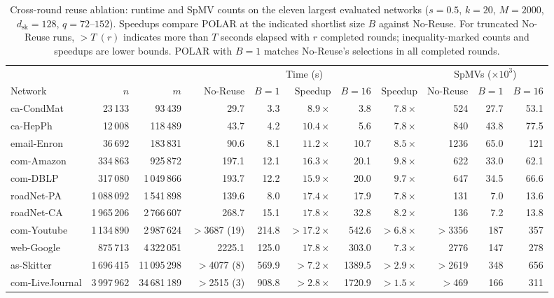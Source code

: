 \documentclass[conference]{IEEEtran}
\theoremstyle{definition}
\newcommand{\POLAR}{\textsc{POLAR}}
\newcommand{\dsk}{d_{\mathrm{sk}}}
\begin{document}
\begin{table}[!t]
\centering
\caption{Cross-round reuse ablation: runtime and SpMV counts on the eleven largest evaluated networks
($s=0.5$, $k=20$, $M=2000$, $\dsk=128$, $q=72$--$152$).
Speedups compare \POLAR{} at the indicated shortlist size $B$
against No-Reuse. For truncated No-Reuse runs, $>T\ (r)$ indicates more
than $T$ seconds elapsed with $r$ completed rounds; inequality-marked
counts and speedups are lower bounds. \POLAR{} with $B=1$ matches
No-Reuse's selections in all completed rounds.}
\label{tab:time}
\footnotesize
\setlength{\tabcolsep}{4.2pt}
\renewcommand{\arraystretch}{1.08}
\begin{tabular}{@{}lrrrrrrrrrr@{}}
\toprule
& & & \multicolumn{5}{c}{Time (s)} & \multicolumn{3}{c}{SpMVs ($\times10^3$)}\\
\cmidrule(lr){4-8}\cmidrule(lr){9-11}
Network & $n$ & $m$ & No-Reuse & $B=1$ & Speedup & $B=16$ & Speedup & No-Reuse & $B=1$ & $B=16$\\
\midrule
ca-CondMat & 23\,133 & 93\,439 & 29.7 & 3.3 & $8.9\times$ & 3.8 & $7.8\times$ & 524 & 27.7 & 53.1\\
ca-HepPh & 12\,008 & 118\,489 & 43.7 & 4.2 & $10.4\times$ & 5.6 & $7.8\times$ & 840 & 43.8 & 77.5\\
email-Enron & 36\,692 & 183\,831 & 90.6 & 8.1 & $11.2\times$ & 10.7 & $8.5\times$ & 1236 & 65.0 & 121\\
com-Amazon & 334\,863 & 925\,872 & 197.1 & 12.1 & $16.3\times$ & 20.1 & $9.8\times$ & 622 & 33.0 & 62.1\\
com-DBLP & 317\,080 & 1\,049\,866 & 193.7 & 12.2 & $15.9\times$ & 20.0 & $9.7\times$ & 647 & 34.5 & 66.6\\
roadNet-PA & 1\,088\,092 & 1\,541\,898 & 139.6 & 8.0 & $17.4\times$ & 17.9 & $7.8\times$ & 131 & 7.0 & 13.6\\
roadNet-CA & 1\,965\,206 & 2\,766\,607 & 268.7 & 15.1 & $17.8\times$ & 32.8 & $8.2\times$ & 136 & 7.2 & 13.8\\
com-Youtube & 1\,134\,890 & 2\,987\,624 & $>$3687 (19) & 214.8 & $>17.2\times$ & 542.6 & $>6.8\times$ & $>$3356 & 187 & 357\\
web-Google & 875\,713 & 4\,322\,051 & 2225.1 & 125.0 & $17.8\times$ & 303.0 & $7.3\times$ & 2776 & 147 & 278\\
as-Skitter & 1\,696\,415 & 11\,095\,298 & $>$4077 (8) & 569.9 & $>7.2\times$ & 1389.5 & $>2.9\times$ & $>$2619 & 348 & 656\\
com-LiveJournal & 3\,997\,962 & 34\,681\,189 & $>$2515 (3) & 908.8 & $>2.8\times$ & 1720.9 & $>1.5\times$ & $>$469 & 166 & 311\\
\bottomrule
\end{tabular}
\end{table}
\end{document}
